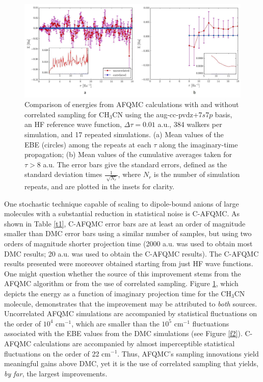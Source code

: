\begin{center}
\begin{figure}[htbp]
\includegraphics[width=\textwidth]{Images/chapter2/correlated_sampling.pdf}
\caption{Comparison of energies from AFQMC calculations with and without correlated sampling for CH$_{3}$CN using the aug-cc-pvdz+7$s$7$p$ basis, an HF reference wave function, $\Delta \tau=0.01$ a.u., 384 walkers per simulation, and 17 repeated simulations. (a) Mean values of the EBE (circles) among the repeats at each $\tau$ along the imaginary-time propagation; (b) Mean values of the cumulative averages taken for $\tau > 8$ a.u. The error bars give the standard errors, defined as the standard deviation times $\frac{1}{\sqrt[]{N_r}}$, where $N_r$ is the number of simulation repeats, and are plotted in the insets for clarity.}
\label{f3}
\end{figure}
\end{center}
One stochastic technique capable of scaling to dipole-bound anions of large molecules with a substantial reduction in statistical noise is C-AFQMC. As shown in Table \ref{t1}, C-AFQMC error bars are at least an order of magnitude smaller than DMC error bars using
a similar number of samples, but using two orders of magnitude shorter projection time (2000 a.u. was used to obtain most DMC results; 20 a.u. was used to obtain the C-AFQMC results). The C-AFQMC results presented were moreover obtained starting from just HF wave functions. One might question whether the source of this improvement stems from the AFQMC algorithm or from the use of correlated sampling. Figure \ref{f3}, which depicts the energy as a function of imaginary projection time for the CH$_{3}$CN molecule, demonstrates that the improvement may be attributed to \textit{both} sources. Uncorrelated AFQMC simulations are accompanied by statistical fluctuations on the order of $10^{4}$ cm$^{-1}$, which are smaller than the $10^{5}$ cm$^{-1}$ fluctuations associated with the EBE values from the DMC simulations (see Figure \ref{f2}). C-AFQMC calculations are accompanied by almost imperceptible statistical fluctuations on the order of 22 cm$^{-1}$. Thus, AFQMC's sampling innovations yield meaningful gains above DMC, yet it is the use of correlated sampling that yields, \textit{by far}, the largest improvements. 

